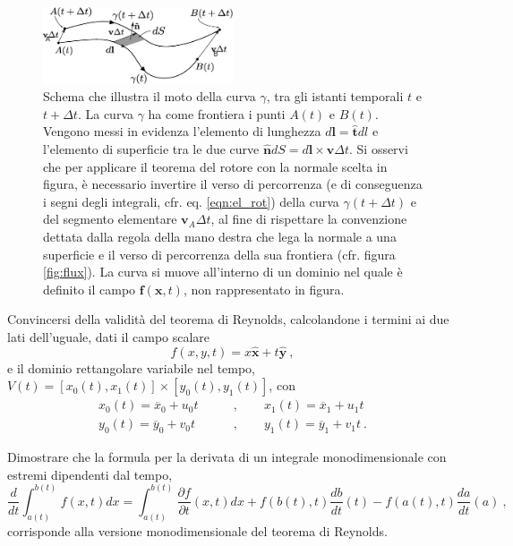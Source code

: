 \vspace{-1cm}
\begin{figure}[h]%
 \centering
 \includegraphics[width=0.5\textwidth]{./fig/circ.eps}
 \caption{Schema che illustra il moto della curva $\gamma$, tra gli istanti temporali $t$ e 
          $t+\Delta t$. La curva $\gamma$ ha come frontiera i punti $A(t)$ e
          $B(t)$. Vengono messi in evidenza l'elemento di lunghezza
          $d\bm{l} = \bm{\hat{t}} dl$ e l'elemento di superficie tra le due
          curve $\bm{\hat{n}}dS = d\bm{l} \times \bm{v} \Delta t$.
          Si osservi che per applicare il teorema del rotore con la normale
          scelta in figura, è necessario invertire il verso di percorrenza
          (e di conseguenza i segni degli integrali, cfr. eq.
          \ref{eqn:el_rot})
          della curva $\gamma(t+\Delta t)$ e del segmento elementare
          $\bm{v}_A \Delta t$, al fine di rispettare la convenzione dettata
          dalla regola della mano destra che lega la normale a una superficie
          e il verso di percorrenza della sua frontiera (cfr. figura 
          \ref{fig:flux}). La curva si muove all'interno di un dominio nel
          quale è definito il campo $\bm{f}(\bm{x},t)$, non rappresentato
          in figura.}
\label{fig:circ}
\end{figure} 


\begin{exercise}
 Convincersi della validità del teorema di Reynolds, calcolandone i termini ai due lati dell'uguale, dati
 il campo scalare
 \begin{equation}
  f(x,y,t) = x \bm{\hat{x}} + t \bm{\hat{y}} \ ,
 \end{equation} 
 e il dominio rettangolare variabile nel tempo, $V(t) = [x_0(t),x_1(t)]\!\times\![y_0(t),y_1(t)]$, con 
 \begin{equation}
 \begin{aligned}
  x_0(t) = \overline{x}_0 + u_0 t \qquad & , \qquad   x_1(t) = \overline{x}_1 + u_1 t \\
  y_0(t) = \overline{y}_0 + v_0 t \qquad & , \qquad   y_1(t) = \overline{y}_1 + v_1 t \ .
 \end{aligned}
 \end{equation}
\end{exercise}

\begin{exercise}
 Dimostrare che la formula per la derivata di un integrale monodimensionale con estremi dipendenti
 dal tempo,
\begin{equation}
 \dfrac{d}{d t} \int_{a(t)}^{b(t)} f(x,t) dx = 
 \int_{a(t)}^{b(t)} \dfrac{\partial f}{\partial t}(x,t) dx + 
 f(b(t),t) \dfrac{d b}{d t}(t) - f(a(t),t) \dfrac{d a}{d t}(a) \ ,
\end{equation}
 corrisponde alla versione monodimensionale del teorema di Reynolds.
\end{exercise}

 
\newpage
